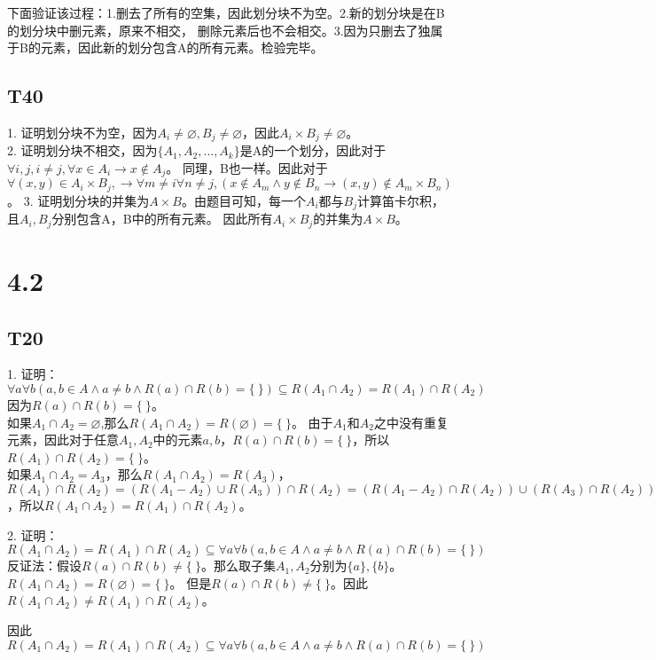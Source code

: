 \documentclass{article}
\begin{document}
下面验证该过程：1.删去了所有的空集，因此划分块不为空。2.新的划分块是在B的划分块中删元素，原来不相交，
删除元素后也不会相交。3.因为只删去了独属于B的元素，因此新的划分包含A的所有元素。检验完毕。
\subsection{T40}
1. 证明划分块不为空，因为$A_i \neq \varnothing, B_j \neq \varnothing$，因此$A_i \times B_j \neq \varnothing$。\\
2. 证明划分块不相交，因为$\{A_1, A_2, \dots, A_k\}$是A的一个划分，因此对于$\forall i, j, i\neq j, \forall x \in A_i \rightarrow x \notin A_j$。
同理，B也一样。因此对于$\forall (x, y) \in A_i \times B_j, \rightarrow \forall m \neq i\forall n \neq j, (x \notin A_m \land y \notin B_n \rightarrow (x, y) \notin A_m \times B_n)$。
3. 证明划分块的并集为$A \times B$。由题目可知，每一个$A_i$都与$B_j$计算笛卡尔积，且$A_i,B_j$分别包含A，B中的所有元素。
因此所有$A_i \times B_j$的并集为$A \times B$。
\section{4.2}
\subsection{T20}
1. 证明：$\forall a \forall b(a, b \in A \land a \neq b \land R(a) \cap R(b) = \{\ \}) \subseteq R(A_1 \cap A_2) = R(A_1) \cap R(A_2)$\\
因为$R(a) \cap R(b) = \{\ \}$。\\
如果$A_1 \cap A_2 = \varnothing$,那么$R(A_1 \cap A_2) = R(\varnothing) = \{\ \}$。
由于$A_1$和$A_2$之中没有重复元素，因此对于任意$A_1, A_2$中的元素$a, b$，$R(a) \cap R(b) = \{\ \}$，所以$R(A_1) \cap R(A_2) = \{\ \}$。\\
如果$A_1 \cap A_2 = A_3$，那么$R(A_1 \cap A_2) = R(A_3)$，$R(A_1) \cap R(A_2) = (R(A_1 - A_2) \cup R(A_3)) \cap R(A_2) = 
(R(A_1 - A_2) \cap R(A_2)) \cup (R(A_3) \cap R(A_2)) = R(A_3)$，所以$R(A_1 \cap A_2) = R(A_1) \cap R(A_2)$。

2. 证明：$R(A_1 \cap A_2) = R(A_1) \cap R(A_2) \subseteq \forall a \forall b(a, b \in A \land a \neq b \land R(a) \cap R(b) = \{\ \})$\\
反证法：假设$R(a) \cap R(b) \neq \{\ \}$。那么取子集$A_1, A_2$分别为$\{a\}, \{b\}$。$R(A_1 \cap A_2) = R(\varnothing) = \{\ \}$。
但是$R(a) \cap R(b) \neq \{\ \}$。因此$R(A_1 \cap A_2) \neq R(A_1) \cap R(A_2)$。

因此
$R(A_1 \cap A_2) = R(A_1) \cap R(A_2) \subseteq \forall a \forall b(a, b \in A \land a \neq b \land R(a) \cap R(b) = \{\ \})$
\end{document}
